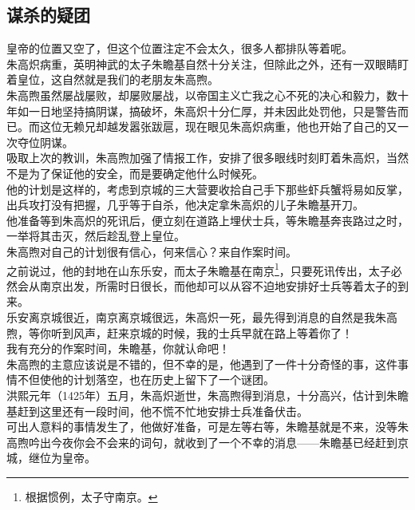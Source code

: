 \begin{multicols}{\theparacolNo}
\subsection{谋杀的疑团}
皇帝的位置又空了，但这个位置注定不会太久，很多人都排队等着呢。\\

朱高炽病重，英明神武的太子朱瞻基自然十分关注，但除此之外，还有一双眼睛盯着皇位，这自然就是我们的老朋友朱高煦。\\

朱高煦虽然屡战屡败，却屡败屡战，以帝国主义亡我之心不死的决心和毅力，数十年如一日地坚持搞阴谋，搞破坏，朱高炽十分仁厚，并未因此处罚他，只是警告而已。而这位无赖兄却越发嚣张跋扈，现在眼见朱高炽病重，他也开始了自己的又一次夺位阴谋。\\

吸取上次的教训，朱高煦加强了情报工作，安排了很多眼线时刻盯着朱高炽，当然不是为了保证他的安全，而是要确定他什么时候死。\\

他的计划是这样的，考虑到京城的三大营要收拾自己手下那些虾兵蟹将易如反掌，出兵攻打没有把握，几乎等于自杀，他决定拿朱高炽的儿子朱瞻基开刀。\\

他准备等到朱高炽的死讯后，便立刻在道路上埋伏士兵，等朱瞻基奔丧路过之时，一举将其击灭，然后趁乱登上皇位。\\

朱高煦对自己的计划很有信心，何来信心？来自作案时间。\\

之前说过，他的封地在山东乐安，而太子朱瞻基在南京\footnote{根据惯例，太子守南京。}，只要死讯传出，太子必然会从南京出发，所需时日很长，而他却可以从容不迫地安排好士兵等着太子的到来。\\

乐安离京城很近，南京离京城很远，朱高炽一死，最先得到消息的自然是我朱高煦，等你听到风声，赶来京城的时候，我的士兵早就在路上等着你了！\\

我有充分的作案时间，朱瞻基，你就认命吧！\\

朱高煦的主意应该说是不错的，但不幸的是，他遇到了一件十分奇怪的事，这件事情不但使他的计划落空，也在历史上留下了一个谜团。\\

洪熙元年（1425年）五月，朱高炽逝世，朱高煦得到消息，十分高兴，估计到朱瞻基赶到这里还有一段时间，他不慌不忙地安排士兵准备伏击。\\

可出人意料的事情发生了，他做好准备，可是左等右等，朱瞻基就是不来，没等朱高煦吟出今夜你会不会来的词句，就收到了一个不幸的消息——朱瞻基已经赶到京城，继位为皇帝。\\


\end{multicols}
